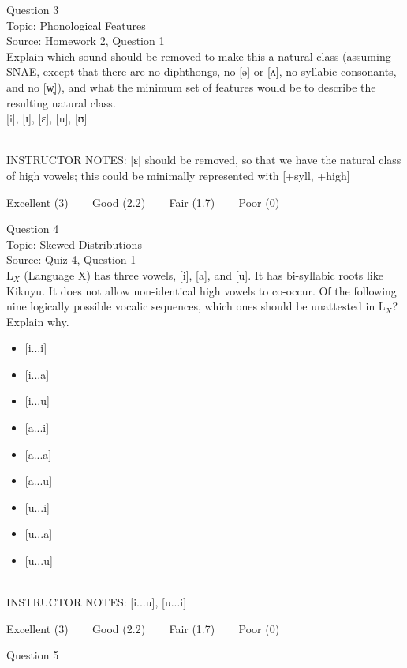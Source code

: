 \documentclass[12pt]{article}
\begin{document}
{\large Question 3}\\

Topic: Phonological Features\\
Source: Homework 2, Question 1\\

Explain which sound should be removed to make this a natural class (assuming SNAE, except that there are no diphthongs, no [ə] or [ʌ], no syllabic consonants, and no [w̥]), and what the minimum set of features would be to describe the resulting natural class.\\

{[i]}, {[ɪ]}, {[ɛ]}, {[u]}, {[ʊ]}


~\\
INSTRUCTOR NOTES: [ɛ] should be removed, so that we have the natural class of high vowels; this could be minimally represented with [+syll, +high]


\vfill
Excellent (3) ~~~ Good (2.2) ~~~ Fair (1.7) ~~~ Poor (0)
\newpage

{\large Question 4}\\

Topic: Skewed Distributions\\
Source: Quiz 4, Question 1\\

L$_X$ (Language X) has three vowels, [i], [a], and [u]. It has bi-syllabic roots like Kikuyu. It does not allow non-identical high vowels to co-occur. Of the following nine logically possible vocalic sequences, which ones should be unattested in L$_X$? Explain why.\\

\begin{itemize} \item {[i...i]} \item {[i...a]} \item {[i...u]} \item {[a...i]} \item {[a...a]} \item {[a...u]} \item {[u...i]} \item {[u...a]} \item {[u...u]} \end{itemize}


~\\
INSTRUCTOR NOTES: [i...u], [u...i]


\vfill
Excellent (3) ~~~ Good (2.2) ~~~ Fair (1.7) ~~~ Poor (0)
\newpage

{\large Question 5}\\
\end{document}

